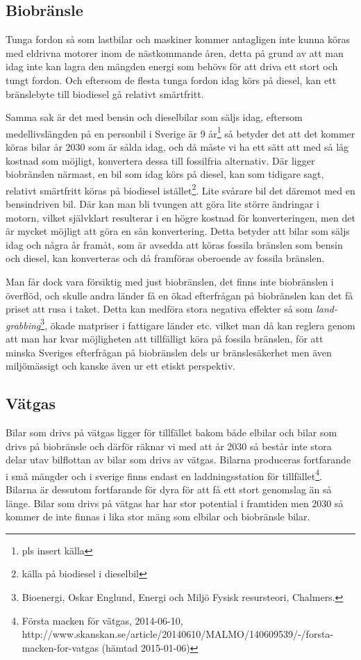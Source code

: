 \documentclass[a4paper,11pt,fleqn, titlepage]{article}
\begin{document}
\subsection{Biobränsle}
Tunga fordon så som lastbilar och maskiner kommer antagligen inte kunna
köras med eldrivna motorer inom de nästkommande åren, detta på grund av att
man idag inte kan lagra den mängden energi som behövs för att driva ett
stort och tungt fordon. Och eftersom de flesta tunga fordon idag körs på
diesel, kan ett bränslebyte till biodiesel gå relativt smärtfritt.

Samma sak är det med bensin och dieselbilar som säljs idag, eftersom
medellivslängden på en personbil i Sverige är 9 år\footnote{pls insert
källa} så betyder det att det kommer köras bilar år 2030 som är sålda idag,
och då måste vi ha ett sätt att med så låg kostnad som möjligt, konvertera
dessa till fossilfria alternativ. Där ligger biobränslen närmast, en bil
som idag körs på diesel, kan som tidigare sagt, relativt smärtfritt köras
på biodiesel istället\footnote{källa på biodiesel i dieselbil}. Lite
svårare bil det däremot med en bensindriven bil. Där kan man bli tvungen
att göra lite större ändringar i motorn, vilket självklart resulterar i en
högre kostnad för konverteringen, men det är mycket möjligt att göra en sån
konvertering. Detta betyder att bilar som säljs idag och några år framåt,
som är avsedda att köras fossila bränslen som bensin och diesel, kan
konverteras och då framföras oberoende av fossila bränslen.

Man får dock vara försiktig med just biobränslen, det finns inte
biobränslen i överflöd, och skulle andra länder få en ökad efterfrågan på
biobränslen kan det få priset att rusa i taket. Detta kan medföra stora
negativa effekter så som \emph{land-grabbing}\footnote{Bioenergi, Oskar
Englund, Energi och Miljö Fysisk resursteori, Chalmers.}, ökade matpriser i
fattigare länder etc. vilket man då kan reglera genom att man har kvar
möjligheten att tillfälligt köra på fossila bränslen, för att minska
Sveriges efterfrågan på biobränslen dels ur bränslesäkerhet men även
miljömässigt och kanske även ur ett etiskt perspektiv.

\subsection{Vätgas}
Bilar som drivs på vätgas ligger för tillfället bakom både elbilar och bilar som drivs på biobränsle och därför räknar vi med att år 2030 så består inte stora delar utav bilflottan av bilar som drivs av vätgas. Bilarna produceras fortfarande i små mängder och i sverige finns endast en laddningsstation för tillfället\footnote{Första macken för vätgas, 2014-06-10, \\
http://www.skanskan.se/article/20140610/MALMO/140609539/-/forsta-macken-for-vatgas (hämtad 2015-01-06)}.
Bilarna är dessutom fortfarande för dyra för att få ett stort genomslag än så länge. Bilar som drivs på vätgas har har stor potential i framtiden men 2030 så kommer de inte finnas i lika stor mäng som elbilar och biobränsle bilar.
\end{document}
